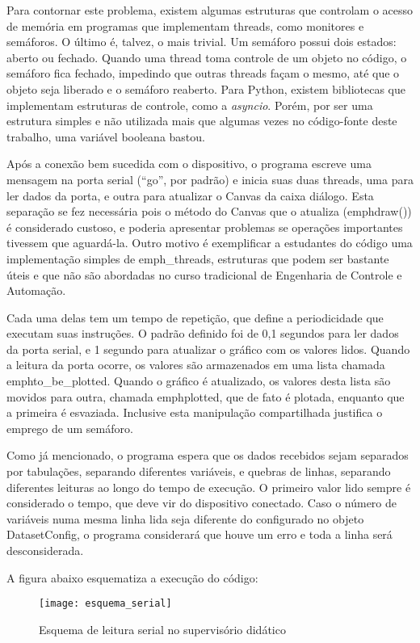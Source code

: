 Para contornar este problema, existem algumas estruturas que controlam o acesso de memória em programas que implementam threads, como monitores e semáforos. O último é, talvez, o mais trivial. Um semáforo possui dois estados: aberto ou fechado. Quando uma thread toma controle de um objeto no código, o semáforo fica fechado, impedindo que outras threads façam o mesmo, até que o objeto seja liberado e o semáforo reaberto. Para Python, existem bibliotecas que implementam estruturas de controle, como a \emph{asyncio}. Porém, por ser uma estrutura simples e não utilizada mais que algumas vezes no código-fonte deste trabalho, uma variável booleana bastou.

Após a conexão bem sucedida com o dispositivo, o programa escreve uma mensagem na porta serial (“go”, por padrão) e inicia suas duas threads, uma para ler dados da porta, e outra para atualizar o Canvas da caixa diálogo. Esta separação se fez necessária pois o método do Canvas que o atualiza (emph{draw()}) é considerado custoso, e poderia apresentar problemas se operações importantes tivessem que aguardá-la. Outro motivo é exemplificar a estudantes do código uma implementação simples de emph{\_threads}, estruturas que podem ser bastante úteis e que não são abordadas no curso tradicional de Engenharia de Controle e Automação.

Cada uma delas tem um tempo de repetição, que define a periodicidade que executam suas instruções. O padrão definido foi de 0,1 segundos para ler dados da porta serial, e 1 segundo para atualizar o gráfico com os valores lidos. Quando a leitura da porta ocorre, os valores são armazenados em uma lista chamada emph{to\_be\_plotted}. Quando o gráfico é atualizado, os valores desta lista são movidos para outra, chamada emph{plotted}, que de fato é plotada, enquanto que a primeira é esvaziada. Inclusive esta manipulação compartilhada justifica o emprego de um semáforo.

Como já mencionado, o programa espera que os dados recebidos sejam separados por tabulações, separando diferentes variáveis, e quebras de linhas, separando diferentes leituras ao longo do tempo de execução. O primeiro valor lido sempre é considerado o tempo, que deve vir do dispositivo conectado. Caso o número de variáveis numa mesma linha lida seja diferente do configurado no objeto DatasetConfig, o programa considerará que houve um erro e toda a linha será desconsiderada.

A figura abaixo esquematiza a execução do código:

\begin{figure}
	\centering
	\texttt{[image: esquema\_serial]}
	\caption{Esquema de leitura serial no supervisório didático}
	\label{img_esquema_serial}
\end{figure}

